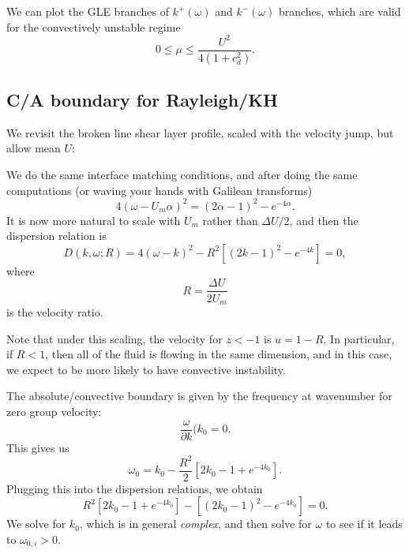 \documentclass[a4paper]{article}
\begin{document}
We can plot the GLE branches of $k^+(\omega)$ and $k^-(\omega)$ branches, which are valid for the convectively unstable regime
\[
  0 \leq \mu \leq \frac{U^2}{4 (1 + c_d^2)}.
\]

\subsection{C/A boundary for Rayleigh/KH}
We revisit the broken line shear layer profile, scaled with the velocity jump, but allow mean $U$:
\begin{center}
\end{center}
We do the same interface matching conditions, and after doing the same computations (or waving your hands with Galilean transforms)
\[
  4 (\omega - U_m \alpha)^2 = (2\alpha - 1)^2 - e^{-4\alpha}.
\]
It is now more natural to scale with $U_m$ rather than $\Delta U/2$, and then the dispersion relation is
\[
  D(k, \omega; R) = 4(\omega - k)^2 - R^2[(2k - 1)^2 - e^{-4k}] = 0,
\]
where
\[
  R = \frac{\Delta U}{2 U_m}
\]
is the velocity ratio.

Note that under this scaling, the velocity for $z < -1$ is $u = 1 - R$. In particular, if $R < 1$, then all of the fluid is flowing in the same dimension, and in this case, we expect to be more likely to have convective instability.

The absolute/convective boundary is given by the frequency at wavenumber for zero group velocity:
\[
  \frac{\omega}{\partial k}(k_0 = 0.
\]
This gives us
\[
  \omega_0 = k_0 - \frac{R^2}{2} [2k_0 - 1 + e^{-4k_0}].
\]
Plugging this into the dispersion relations, we obtain
\[
  R^2 [2k_0 - 1 + e^{-4k_0}] - [(2k_0 -1 )^2 - e^{-4k_0}] = 0.
\]
We solve for $k_0$, which is in general \emph{complex}, and then solve for $\omega$ to see if it leads to $\omega_{0, i} > 0$.
\end{document}
